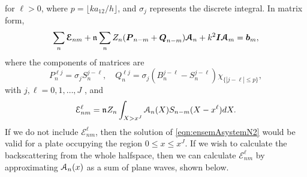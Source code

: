 \documentclass[12pt, a4paper]{article}
\begin{document}
for $\ell >0$, where $p = \lfloor k a_{12}/h \rfloor$, and $\sigma_j$ represents the discrete integral. In matrix form,
\begin{equation}
  \sum_{n} \boldsymbol{\mathcal E}_{nm}
+ \mathfrak n_{} \sum_{n}  Z_n ( \boldsymbol{P}_{n-m} + \boldsymbol{Q}_{n-m}) \boldsymbol{\mathcal A}_n
+  k^2 \boldsymbol{I} \boldsymbol{\mathcal A}_m  =  \boldsymbol{b}_m,
  \label{eqn:ensemAsystemN2}
\end{equation}
where the components of matrices are
\begin{equation}
  P_{n}^{\ell j} =  \sigma_j S_{n}^{j-\ell}, \quad Q_{n}^{\ell j} = \sigma_j (B_{n}^{j-\ell} - S_{n}^{j -\ell} ) \chi_{\{|j-\ell| \leq p\}},
\end{equation}
with $j,\ell = 0,1, \ldots, J$
, and
\begin{equation}
  \mathcal E_{nm}^\ell  = \nfrac {} Z_n \int_{X> x^J} \A n (X) S_{n-m}(X-x^\ell) dX. %
  \label{eqn:E}
\end{equation}
If we do not include $\mathcal E_{nm}^\ell$, then the solution of \eqref{eqn:ensemAsystemN2} would be valid for a plate occupying the region $0 \leq x \leq x^J$. If we wish to calculate the backscattering from the whole halfspace, then we can calculate $\mathcal E_{nm}^\ell$ by approximating $\mathcal A_n(x)$ as a sum of plane waves, shown below.
\end{document}
